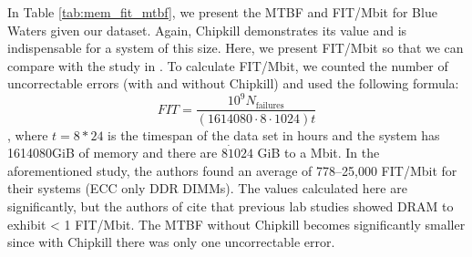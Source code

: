 In Table \ref{tab:mem_fit_mtbf}, we present the MTBF and FIT/Mbit for Blue
Waters given our dataset.  Again, Chipkill demonstrates its value and is
indispensable for a system of this size.   Here, we present FIT/Mbit so that
we can compare with the study in \cite{schroeder2009dram}.  To calculate
FIT/Mbit, we counted the number of uncorrectable errors (with and without
Chipkill) and used the following formula:
\begin{equation*}
  FIT = \frac{10^9N_{\textrm{failures}}}{(1614080\cdot8\cdot1024)t}
\end{equation*}
, where $t=8*24$ is the timespan of the data set in hours and the system has
1614080GiB of memory and there are $8\dot1024$ GiB to a Mbit. In the
aforementioned study, the authors found an average of 778--25,000 FIT/Mbit for
their systems (ECC only DDR DIMMs).  The values calculated here are
significantly, but the authors of \cite{schroeder2009dram} cite that previous
lab studies showed DRAM to exhibit < 1 FIT/Mbit.  The MTBF without Chipkill
becomes significantly smaller since with Chipkill there was only one
uncorrectable error.
